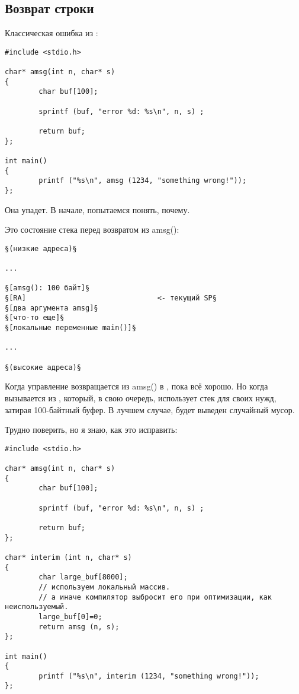 \subsection{Возврат строки}

Классическая ошибка из \RobPikePractice{}:

\begin{lstlisting}[style=customc]
#include <stdio.h>

char* amsg(int n, char* s)
{
        char buf[100];

        sprintf (buf, "error %d: %s\n", n, s) ;

        return buf;
};

int main()
{
        printf ("%s\n", amsg (1234, "something wrong!"));
};
\end{lstlisting}

Она упадет.
В начале, попытаемся понять, почему.

Это состояние стека перед возвратом из amsg():

\begin{lstlisting}
§(низкие адреса)§

...

§[amsg(): 100 байт]§
§[RA]                               <- текущий SP§
§[два аргумента amsg]§
§[что-то еще]§
§[локальные переменные main()]§

...

§(высокие адреса)§
\end{lstlisting}

Когда управление возвращается из amsg() в \main, пока всё хорошо.
Но когда \printf вызывается из \main, который, в свою очередь, использует стек для своих нужд, затирая 100-байтный буфер.
В лучшем случае, будет выведен случайный мусор.

Трудно поверить, но я знаю, как это исправить:

\begin{lstlisting}[style=customc]
#include <stdio.h>

char* amsg(int n, char* s)
{
        char buf[100];

        sprintf (buf, "error %d: %s\n", n, s) ;

        return buf;
};

char* interim (int n, char* s)
{
        char large_buf[8000];
        // используем локальный массив.
        // а иначе компилятор выбросит его при оптимизации, как неиспользуемый.
        large_buf[0]=0;
        return amsg (n, s);
};

int main()
{
        printf ("%s\n", interim (1234, "something wrong!"));
};
\end{lstlisting}

